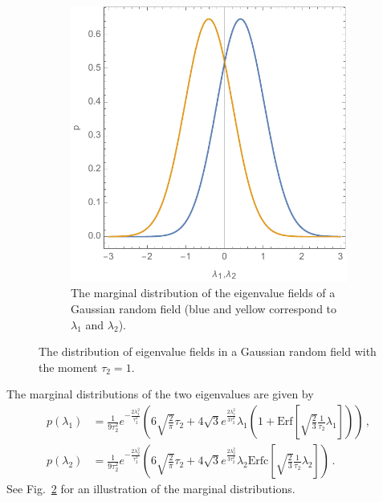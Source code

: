 \documentclass[a4paper, 11pt]{article}
\begin{document}
\begin{figure}
\begin{subfigure}[b]{0.4\textwidth}
\includegraphics[width=\textwidth]{Eigenvalues}
\caption{The marginal distribution of the eigenvalue fields of a Gaussian random field (blue and yellow correspond to $\lambda_1$ and $\lambda_2$).}
\label{fig:eigenvalues}
\end{subfigure}
\caption{The distribution of eigenvalue fields in a Gaussian random field with the moment $\tau_2=1$.}
\end{figure}
The marginal distributions of the two eigenvalues are given by
\begin{align}
p(\lambda_1) &= 
\frac{1}{9\tau_2^2} e^{-\frac{2 \lambda_1^2}{\tau_2^2}}\left(
6 \sqrt{\frac{2}{\pi}} \tau_2 + 4 \sqrt{3} e^{\frac{2\lambda_1^2}{3\tau_2^2}}\lambda_1\left(1+\text{Erf}\left[\sqrt{\frac{2}{3}}\frac{1}{\tau_2} \lambda_1\right]\right)
\right)\,,\\
p(\lambda_2) &= 
\frac{1}{9\tau_2^2} e^{-\frac{2 \lambda_2^2}{\tau_2^2}}\left(
6 \sqrt{\frac{2}{\pi}} \tau_2 + 4 \sqrt{3} e^{\frac{2\lambda_2^2}{3\tau_2^2}}\lambda_2\text{Erfc}\left[\sqrt{\frac{2}{3}}\frac{1}{\tau_2} \lambda_2\right]\right)\,.
\end{align}
See Fig.\ \ref{fig:eigenvalues} for an illustration of the marginal distributions.
\end{document}
